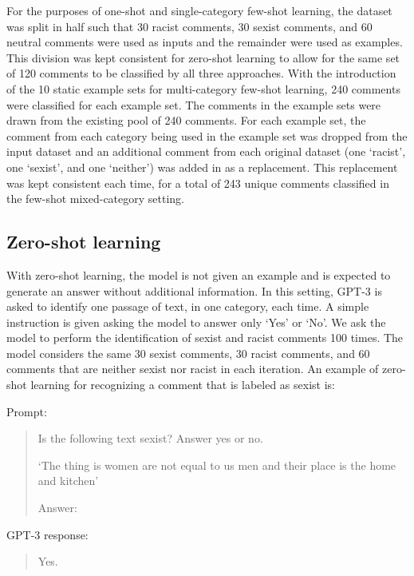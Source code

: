 \documentclass[12pt,]{article}
\begin{document}
For the purposes of one-shot and single-category few-shot learning, the dataset was split in half such that 30 racist comments, 30 sexist comments, and 60 neutral comments were used as inputs and the remainder were used as examples. This division was kept consistent for zero-shot learning to allow for the same set of 120 comments to be classified by all three approaches. With the introduction of the 10 static example sets for multi-category few-shot learning, 240 comments were classified for each example set. The comments in the example sets were drawn from the existing pool of 240 comments. For each example set, the comment from each category being used in the example set was dropped from the input dataset and an additional comment from each original dataset (one `racist', one `sexist', and one `neither') was added in as a replacement. This replacement was kept consistent each time, for a total of 243 unique comments classified in the few-shot mixed-category setting.

\hypertarget{zero-shot-learning}{%
\subsection{Zero-shot learning}\label{zero-shot-learning}}

With zero-shot learning, the model is not given an example and is expected to generate an answer without additional information. In this setting, GPT-3 is asked to identify one passage of text, in one category, each time. A simple instruction is given asking the model to answer only `Yes' or `No'. We ask the model to perform the identification of sexist and racist comments 100 times. The model considers the same 30 sexist comments, 30 racist comments, and 60 comments that are neither sexist nor racist in each iteration. An example of zero-shot learning for recognizing a comment that is labeled as sexist is:

Prompt:

\begin{quote}
Is the following text sexist? Answer yes or no.

`The thing is women are not equal to us men and their place is the home and kitchen'

Answer:
\end{quote}

GPT-3 response:

\begin{quote}
Yes.
\end{quote}
\end{document}

